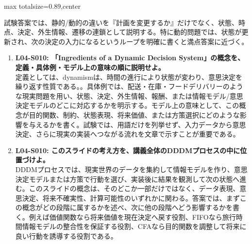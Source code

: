 \begin{minipage}[t]{0.58\textwidth}
\begin{adjustbox}{max totalsize={\textwidth}{0.89\textheight},center}
\begin{minipage}{\textwidth}
試験答案では、静的/動的の違いを『計画を変更するか』だけでなく、状態、時点、決定、外生情報、遷移の連鎖として説明する。特に動的問題では、状態が更新され、次の決定の入力になるというループを明確に書くと満点答案に近づく。\par{}\begin{enumerate}\item \textbf{L04-S010: 「Ingredients of a Dynamic Decision System」の概念を、定義・具体例・モデル上の意味の順に説明せよ。}\\定義としては、dynamismは、時間の進行により状態が変わり、意思決定を繰り返す性質である。。具体例では、配送・在庫・フードデリバリーのような現実問題を用い、状態、決定、外生情報、報酬、または情報モデル/意思決定モデルのどこに対応するかを明示する。モデル上の意味として、この概念が目的関数、制約、状態表現、将来価値、または方策選択にどのような影響を与えるかを書く。試験では、用語だけを列挙せず、入力データから意思決定、さらに現実の実装へつながる流れを文章で示すことが重要である。\item \textbf{L04-S010: このスライドの考え方を、講義全体のDDDMプロセスの中に位置づけよ。}\\DDDMプロセスでは、現実世界のデータを集約して情報モデルを作り、意思決定モデルまたは方策で行動を選び、実装後に結果を観測して次の状態へ進む。このスライドの概念は、そのどこか一部だけではなく、データ表現、意思決定、将来不確実性、計算可能性のいずれかに関わる。答案では、まずこの概念がどの段階に属するかを述べ、次に他の段階へどう影響するかを書く。例えば価値関数なら将来価値を現在決定へ戻す役割、FIFOなら旅行時間情報モデルの整合性を保証する役割、CFAなら目的関数を調整して将来に良い行動を誘導する役割である。\end{enumerate}
\end{minipage}
\end{adjustbox}
\end{minipage}


